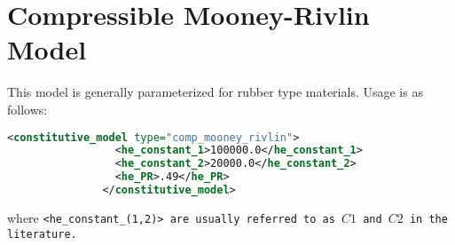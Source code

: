 
\section{Compressible Mooney-Rivlin Model} This model is generally parameterized
for rubber type materials.  Usage is as follows:
\begin{lstlisting}[language=XML]
              <constitutive_model type="comp_mooney_rivlin">
                 <he_constant_1>100000.0</he_constant_1>
                 <he_constant_2>20000.0</he_constant_2>
                 <he_PR>.49</he_PR>
               </constitutive_model>
\end{lstlisting}
where \tt <he\_constant\_(1,2)> \normalfont are usually referred to
as $C1$ and $C2$ in the literature.
